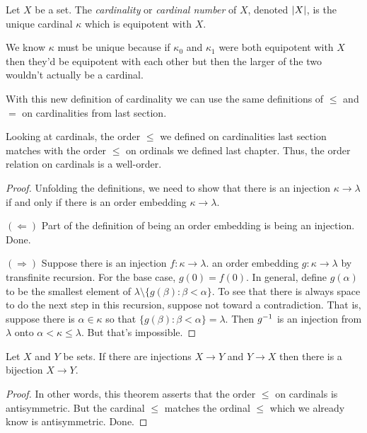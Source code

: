 \documentclass[10pt]{amsart}
\begin{document}
\begin{definition}
Let $X$ be a set. The \emph{cardinality} or \emph{cardinal number} of $X$, denoted $\left\lvert X \right\rvert$, is the unique cardinal $\kappa$ which is equipotent with $X$.
\end{definition}

We know $\kappa$ must be unique because if $\kappa_0$ and $\kappa_1$ were both equipotent with $X$ then they'd be equipotent with each other but then the larger of the two wouldn't actually be a cardinal.

With this new definition of cardinality we can use the same definitions of $\le$ and $=$ on cardinalities from last section.

\begin{proposition}
Looking at cardinals, the order $\le$ we defined on cardinalities last section matches with the order $\le$ on ordinals we defined last chapter. Thus, the order relation on cardinals is a well-order.
\end{proposition}

\begin{proof}
Unfolding the definitions, we need to show that there is an injection $\kappa \to \lambda$ if and only if there is an order embedding $\kappa \to \lambda$.

$(\Leftarrow)$ Part of the definition of being an order embedding is being an injection. Done.

$(\Rightarrow)$ Suppose there is an injection $f : \kappa \to \lambda$.  an order embedding $g : \kappa \to \lambda$ by transfinite recursion. For the base case, $g(0) = f(0)$. In general, define $g(\alpha)$ to be the smallest element of $\lambda \setminus \{ g(\beta) : \beta < \alpha \}$. To see that there is always space to do the next step in this recursion, suppose not toward a contradiction. That is, suppose there is $\alpha \in \kappa$ so that $\{ g(\beta): \beta < \alpha \} = \lambda$. Then $g^{-1}$ is an injection from $\lambda$ onto $\alpha < \kappa \le \lambda$. But that's impossible.
\end{proof}

\begin{corollary}
Let $X$ and $Y$ be sets. If there are injections $X \to Y$ and $Y \to X$ then there is a bijection $X \to Y$.
\end{corollary}

\begin{proof}
In other words, this theorem asserts that the order $\le$ on cardinals is antisymmetric. But the cardinal $\le$ matches the ordinal $\le$ which we already know is antisymmetric. Done.
\end{proof}
\end{document}
